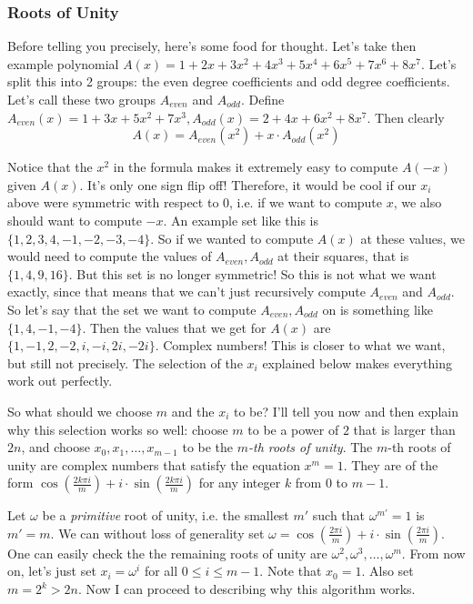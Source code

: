 \subsubsection{Roots of Unity}

Before telling you precisely, here's some food for thought. Let's take then example polynomial $A(x) = 1+2x+3x^2+4x^3+5x^4+6x^5+7x^6+8x^7.$ Let's split this into 2 groups: the even degree coefficients and odd degree coefficients. Let's call these two groups $A_{even}$ and $A_{odd}.$ Define $A_{even}(x) = 1+3x+5x^2+7x^3, A_{odd}(x) = 2+4x+6x^2+8x^7.$ Then clearly \[ A(x) = A_{even}(x^2) + x \cdot A_{odd}(x^2) \]

Notice that the $x^2$ in the formula makes it extremely easy to compute $A(-x)$ given $A(x).$ It's only one sign flip off! Therefore, it would be cool if our $x_i$ above were symmetric with respect to 0, i.e. if we want to compute $x$, we also should want to compute $-x$. An example set like this is $\{1, 2, 3, 4, -1, -2, -3, -4 \}.$ So if we wanted to compute $A(x)$ at these values, we would need to compute the values of $A_{even}, A_{odd}$ at their squares, that is $\{1, 4, 9, 16 \}.$ But this set is no longer symmetric! So this is not what we want exactly, since that means that we can't just recursively compute $A_{even}$ and $A_{odd}.$ So let's say that the set we want to compute $A_{even}, A_{odd}$ on is something like $\{1, 4, -1, -4 \}.$ Then the values that we get for $A(x)$ are $\{1, -1, 2, -2, i, -i, 2i, -2i \}.$ Complex numbers! This is closer to what we want, but still not precisely. The selection of the $x_i$ explained below makes everything work out perfectly.

So what should we choose $m$ and the $x_i$ to be? I'll tell you now and then explain why this selection works so well: choose $m$ to be a power of $2$ that is larger than $2n$, and choose $x_0, x_1, \dots, x_{m-1}$ to be the $m$\emph{-th roots of unity}. The $m$-th roots of unity are complex numbers that satisfy the equation $x^m = 1.$ They are of the form $\cos\left(\frac{2k\pi i}{m}\right) + i \cdot \sin\left(\frac{2k\pi i}{m} \right)$ for any integer $k$ from $0$ to $m-1.$

Let $\omega$ be a \emph{primitive} root of unity, i.e. the smallest $m'$ such that $\omega^{m'} = 1$ is $m' = m.$ We can without loss of generality set $\omega = \cos\left(\frac{2\pi i}{m}\right) + i \cdot \sin\left(\frac{2\pi i}{m} \right).$ One can easily check the the remaining roots of unity are $\omega^2, \omega^3, \dots, \omega^m.$ From now on, let's just set $x_i = \omega^i$ for all $0 \le i \le m-1.$ Note that $x_0 = 1.$ Also set $m = 2^k > 2n.$ Now I can proceed to describing why this algorithm works.

